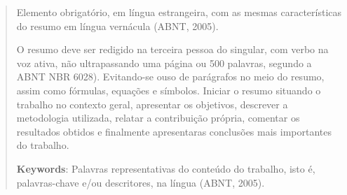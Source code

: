 \begin{abstract}

Elemento obrigatório, em língua estrangeira, com as mesmas características do resumo em língua vernácula (ABNT, 2005).


O resumo deve ser redigido na terceira pessoa do singular, com verbo na voz ativa, não ultrapassando uma página ou 500 palavras, segundo a ABNT NBR 6028). Evitando-se ouso de parágrafos no meio do resumo, assim como fórmulas, equações e símbolos. Iniciar o resumo situando o trabalho no contexto geral, apresentar os objetivos, descrever a metodologia utilizada, relatar a contribuição própria, comentar os resultados obtidos e finalmente apresentaras conclusões mais importantes do trabalho.



{\hspace{-8mm} \bf{Keywords}}: Palavras representativas do conteúdo do trabalho, isto é, palavras-chave e/ou descritores, na língua (ABNT, 2005).

\end{abstract}

\listoffigures



\cleardoublepage
\listoftables
\cleardoublepage


\cleardoublepage
\printglossary[type=\acronymtype,title={Lista de Abreviaturas e Siglas}]
\cleardoublepage



\pagestyle{ruledheader}
\tableofcontents
\pagebreak